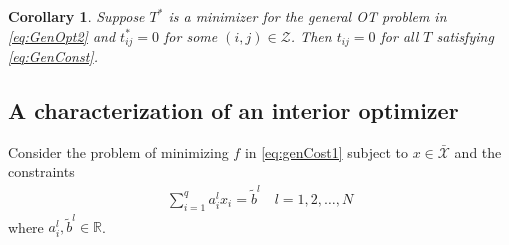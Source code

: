 \documentclass[twocolumn]{article}
\newtheorem{corollary}{Corollary}
\begin{document}

\begin{corollary}
\label{cor:cor1}
Suppose $T^*$ is a minimizer for the general OT problem in  \eqref{eq:GenOpt2} and $t^*_{ij} =0$ for some $(i,j) \in {\mathcal Z}$.
Then $t_{ij} = 0$ for all $T$ satisfying \eqref{eq:GenConst}.
\end{corollary}

\subsection{ A characterization of an interior optimizer}
Consider the
problem of minimizing $f$ in \eqref{eq:genCost1}
subject to $x\in \bar{\mathcal X}$
and the constraints
\begin{align}
\label{eq:linConst}
\sum_{i=1}^q a^l_{i}x _i= \tilde{b}^l \quad l =1, 2, \dots, N
\end{align}
where $a^l_i, \tilde{b}^l \in \mathbb{R}$.
\end{document}
